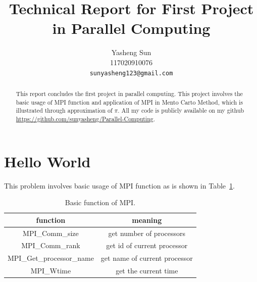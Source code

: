 \documentclass[10pt,twocolumn,letterpaper]{article}
\begin{document}
    
    \title{Technical Report for First Project in Parallel Computing}
    
    \author{Yasheng Sun\\
    117020910076\\
    {\tt\small sunyasheng123@gmail.com}
    }
    
    \maketitle
    
    \begin{abstract}
       This report concludes the first project in parallel computing. 
       This project involves the basic usage of MPI function and 
       application of MPI in Mento Carto Method, which is illustrated through 
       approximation of $\pi$. 
       All my code is publicly available on my github 
       \url{https://github.com/sunyasheng/Parallel-Computing}.

    \end{abstract}
    
    \section{Hello World}
    This problem involves basic usage of MPI function as is shown in Table~\ref{command_table}.  
    \begin{table}
        \begin{center}
        \begin{tabular}{|c|c|}
        \hline
        function & meaning\\
        \hline
        MPI\_Comm\_size & get number of processors \\
        MPI\_Comm\_rank & get id of current processor \\
        MPI\_Get\_processor\_name & get name of current processor \\
        MPI\_Wtime & get the current time\\
        \hline
        \end{tabular}
        \end{center}
        \caption{Basic function of MPI.}
        \label{command_table}
    \end{table}
\end{document}
